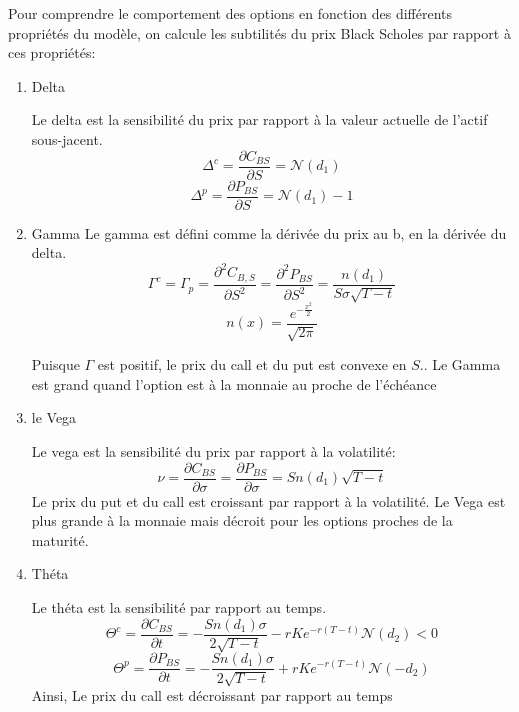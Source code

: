 \documentclass{article}
\theoremstyle{plain}
\theoremstyle{definition}
\begin{document}
Pour comprendre le comportement des options en fonction des diff\'erents propri\'et\'es du mod\`ele, on calcule les subtilit\'es du prix Black Scholes  par rapport \`a ces propri\'et\'es:
\begin{enumerate}
\item Delta

Le delta est la sensibilit\'e du prix par rapport \`a la valeur actuelle de l'actif sous-jacent.
\begin{equation}
\Delta^c = \frac{\partial C_{BS}}{\partial S}=\mathcal{N}(d_1)
\end{equation}
\begin{equation}
\Delta^p=\frac{\partial P_{BS}}{\partial S}=\mathcal{N}(d_1)-1
\end{equation}

\item Gamma
Le gamma est d\'efini comme la d\'eriv\'ee du prix au b, en la d\'eriv\'ee du delta.
\begin{equation}
\Gamma^c=\Gamma_p=\frac{\partial^2 C_{B,S}}{\partial S^2}=\frac{\partial^2 P_{BS}}{\partial S^2}=\frac{n(d_1)}{S\sigma\sqrt{T-t}}
\end{equation}
\begin{equation}
n(x)=\frac{e^{-\frac{x^2}{2}}}{\sqrt{2\pi}}
\end{equation}

Puisque $\Gamma$ est positif, le prix du call et du put est convexe en $S$.. Le Gamma est grand quand l'option est \`a la monnaie au proche de l'\'ech\'eance

\item le Vega

Le vega est la sensibilit\'e du  prix par rapport \`a la volatilit\'e:
\begin{equation}
\nu=\frac{\partial C_{BS}}{\partial \sigma} = \frac{\partial P_{BS}}{\partial\sigma}=Sn(d_1)\sqrt{T-t}
\end{equation}
Le prix du put et du call est croissant par rapport \`a la volatilit\'e. Le Vega est plus grande \`a la monnaie mais d\'ecroit pour les options proches de la maturit\'e.

\item Th\'eta

Le th\'eta est la sensibilit\'e par rapport au temps.
\begin{equation}
\Theta^c=\frac{\partial C_{BS}}{\partial t}=-\frac{Sn(d_1)\sigma}{2\sqrt{T-t}}-rKe^{-r(T-t)}\mathcal{N}(d_2)<0
\end{equation}
\begin{equation}
\Theta^p=\frac{\partial P_{BS}}{\partial t}=-\frac{Sn(d_1)\sigma}{2\sqrt{T-t}}+rKe^{-r(T-t)}\mathcal{N}(-d_2)
\end{equation}
Ainsi, Le prix du call est d\'ecroissant par rapport au temps


\end{enumerate}
\end{document}
